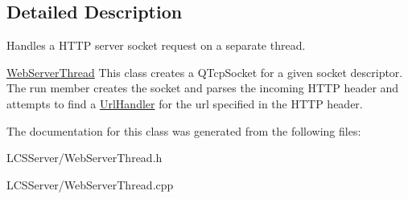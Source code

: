 \subsection{Detailed Description}
Handles a H\+T\+TP server socket request on a separate thread. 

\hyperlink{class_web_server_thread}{Web\+Server\+Thread} This class creates a Q\+Tcp\+Socket for a given socket descriptor. The run member creates the socket and parses the incoming H\+T\+TP header and attempts to find a \hyperlink{class_url_handler}{Url\+Handler} for the url specified in the H\+T\+TP header. 

The documentation for this class was generated from the following files\+:\begin{DoxyCompactItemize}
\item 
L\+C\+S\+Server/Web\+Server\+Thread.\+h\item 
L\+C\+S\+Server/Web\+Server\+Thread.\+cpp\end{DoxyCompactItemize}
